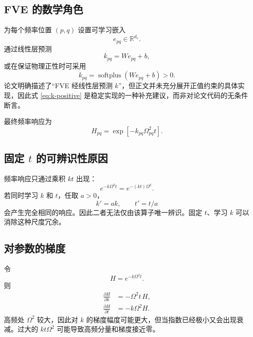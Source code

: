 \documentclass[UTF8,12pt,a4paper,fontset=none]{ctexart}
\numberwithin{equation}{section}
\newcommand{\R}{\mathbb{R}}
\newcommand{\pd}{\partial}
\newcommand{\softplus}{\operatorname{softplus}}
\begin{document}
\subsection{FVE 的数学角色}

为每个频率位置 $(p,q)$ 设置可学习嵌入
\begin{equation}
  e_{pq}\in\R^{d_e}.
\end{equation}
通过线性层预测
\begin{equation}
  k_{pq}=We_{pq}+b,
  \label{eq:k-linear}
\end{equation}
或在保证物理正性时可采用
\begin{equation}
  k_{pq}=\softplus(We_{pq}+b)>0.
  \label{eq:k-positive}
\end{equation}
论文明确描述了“FVE 经线性层预测 $k$”，但正文并未充分展开正值约束的具体实现，因此式 \eqref{eq:k-positive} 是稳定实现的一种补充建议，而非对论文代码的无条件断言。

最终频率响应为
\begin{equation}
  H_{pq}
  =\exp[-k_{pq}\Omega_{pq}^2t].
  \label{eq:adaptive-response}
\end{equation}

\subsection{固定 \texorpdfstring{$t$}{t} 的可辨识性原因}

频率响应只通过乘积 $kt$ 出现：
\begin{equation}
  e^{-k\Omega^2t}=e^{-(kt)\Omega^2}.
\end{equation}
若同时学习 $k$ 和 $t$，任取 $a>0$，
\begin{equation}
  k'=ak,
  \qquad t'=t/a
\end{equation}
会产生完全相同的响应。因此二者无法仅由该算子唯一辨识。固定 $t$、学习 $k$ 可以消除这种尺度冗余。

\subsection{对参数的梯度}

令
\begin{equation}
  H=e^{-k\Omega^2t}.
\end{equation}
则
\begin{align}
  \frac{\pd H}{\pd k}
  &=-\Omega^2t\,H,\\
  \frac{\pd H}{\pd t}
  &=-k\Omega^2H.
\end{align}
高频处 $\Omega^2$ 较大，因此对 $k$ 的梯度幅度可能更大，但当指数已经极小又会出现衰减。过大的 $kt\Omega^2$ 可能导致高频分量和梯度接近零。
\end{document}

